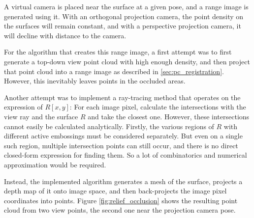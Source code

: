 A virtual camera is placed near the surface at a given pose, and a range image is generated using it. With an orthogonal projection camera, the point density on the surfaces will remain constant, and with a perspective projection camera, it will decline with distance to the camera.

For the algorithm that creates this range image, a first attempt was to first generate a top-down view point cloud with high enough density, and then project that point cloud into a range image as described in \ref{sec:pc_registration}. However, this inevitably leaves points in the occluded areas.

Another attempt was to implement a ray-tracing method that operates on the expression of $R[x,y]$: For each image pixel, calculate the intersections with the view ray and the surface $R$ and take the closest one. However, these intersections cannot easily be calculated analytically. Firstly, the various regions of $R$ with different active embossings must be considered separately. But even on a single such region, multiple intersection points can still occur, and there is no direct closed-form expression for finding them. So a lot of combinatorics and numerical approximation would be required.

Instead, the implemented algorithm generates a mesh of the surface, projects a depth map of it onto image space, and then back-projects the image pixel coordinates into points. Figure \ref{fig:relief_occlusion} shows the resulting point cloud from two view points, the second one near the projection camera pose.

